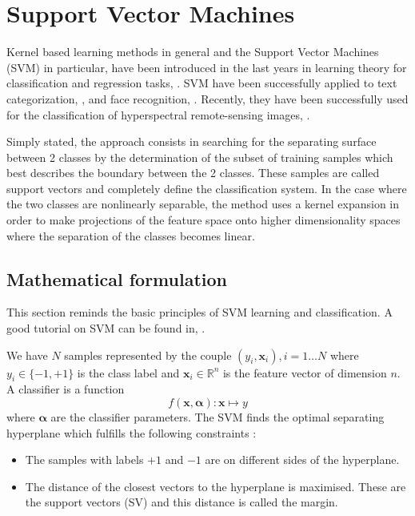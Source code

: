 \ifitkFullVersion

\fi 



\section{Support Vector Machines}
\label{sec:SupportVectorMachines}

Kernel based learning methods in general and the Support Vector
Machines (SVM) in particular, have been introduced in the last years
in learning theory for classification and regression tasks,
\cite{vapnik}. SVM have been successfully applied to text
categorization, \cite{joachims}, and face recognition,
\cite{osuna}. Recently, they have been successfully used for the
classification of hyperspectral remote-sensing images, \cite{bruzzoneSVM}.

Simply stated, the approach consists in searching for the separating
surface between 2 classes by the determination of the subset of
training samples which best describes the boundary between the 2
classes. These samples are called support vectors and completely
define the classification system. In the case where the two classes are
nonlinearly separable, the method uses a kernel expansion in order to make
projections of the feature space onto higher dimensionality spaces
where the separation of the classes becomes linear.

 \subsection{Mathematical formulation}

 This section reminds the basic principles of SVM learning and
 classification. A good tutorial on SVM can be found in, \cite{burges}.
 
We have $N$ samples represented by the couple $(y_i,\mathbf{x}_i),
i=1\ldots N$ where $y_i \in \{-1,+1\}$ is the class label and
$\mathbf{x}_i \in \mathbb{R}^n$ is the feature vector of dimension
$n$. A classifier is a function  $$f(\mathbf{x},\boldsymbol{\alpha}) :
\mathbf{x}\mapsto y$$ where $\boldsymbol{\alpha}$ are the classifier
parameters. The SVM finds the optimal separating hyperplane which
fulfills the following constraints :
    \begin{itemize}
      \item The samples with labels $+1$ and $-1$ are on different
      sides of the hyperplane.
      \item The distance of the closest vectors to the hyperplane is
      maximised. These are the support vectors (SV) and this distance is
      called the margin.
    \end{itemize}

